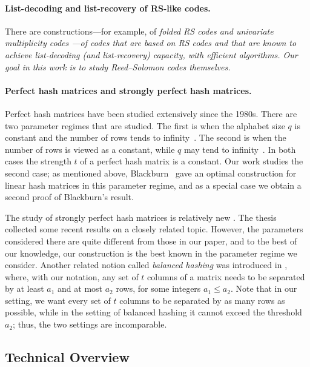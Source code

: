 \documentclass[11pt]{article}
\begin{document}
\paragraph{List-decoding and list-recovery of RS-like codes.}
There are constructions---for example, of \em folded RS codes \em and \em univariate multiplicity codes \em \cite{GR08,wang,Kop15,kopparty2018improved}---of codes that are based on RS codes and that are known to achieve list-decoding (and list-recovery) capacity, with efficient algorithms.  Our goal in this work is to study Reed--Solomon codes themselves.

\paragraph{Perfect hash matrices and strongly perfect hash matrices.} Perfect hash matrices have been studied extensively since the 1980s. There are two parameter regimes that are studied. The first is when the alphabet size $q$ is constant and the number of rows tends to infinity~\cite{nilli1994perfect,fredman1984size,korner1988new,korner1986fredman,xing2019beating}.  The second is when the number of rows is viewed as a constant, while $q$ may tend to infinity~\cite{Blackburn1998Optimal,blackburn2000perfect,shangguan2016separating}.
In both cases the strength $t$ of a perfect hash matrix is a constant.  Our work studies the second case; as mentioned above, Blackburn~\cite{blackburn2000perfect} gave an optimal construction for linear hash matrices in this parameter regime, and as a special case we obtain a second proof of Blackburn's result.

The study of strongly perfect hash matrices is relatively new \cite{shangguan2020degenerate}. The thesis \cite{dougherty2019hash} collected some recent results on a closely related topic. However, the parameters considered there are quite different from those in our paper, and to the best of our knowledge, our construction is the best known in the parameter regime we consider.
Another related notion called {\it balanced hashing} was introduced in \cite{alon2007balanced,alon2009balanced}, where, with our notation, any set of $t$ columns of a matrix needs to be separated by at least $a_1$ and at most $a_2$ rows, for some integers $a_1\le a_2$. Note that in our setting, we want every set of $t$ columns to be separated by as many rows as possible, while in the setting of balanced hashing it cannot exceed the threshold $a_2$; thus, the two settings are incomparable.


\subsection{Technical Overview}\label{sec:tech}
\end{document}
